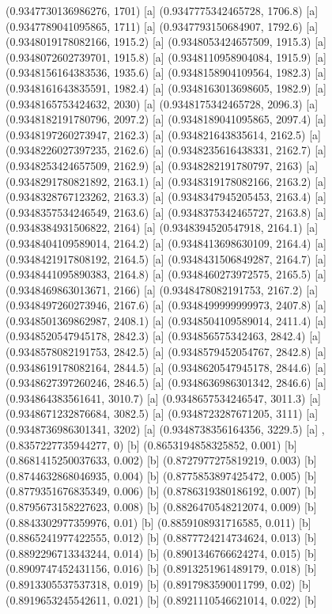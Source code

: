 {{{(0.9347730136986276, 1701) [a] 
(0.9347775342465728, 1706.8) [a] 
(0.9347789041095865, 1711) [a] 
(0.9347793150684907, 1792.6) [a] 
(0.9348019178082166, 1915.2) [a] 
(0.9348053424657509, 1915.3) [a] 
(0.9348072602739701, 1915.8) [a] 
(0.9348110958904084, 1915.9) [a] 
(0.9348156164383536, 1935.6) [a] 
(0.9348158904109564, 1982.3) [a] 
(0.9348161643835591, 1982.4) [a] 
(0.9348163013698605, 1982.9) [a] 
(0.9348165753424632, 2030) [a] 
(0.9348175342465728, 2096.3) [a] 
(0.9348182191780796, 2097.2) [a] 
(0.9348189041095865, 2097.4) [a] 
(0.9348197260273947, 2162.3) [a] 
(0.934821643835614, 2162.5) [a] 
(0.9348226027397235, 2162.6) [a] 
(0.9348235616438331, 2162.7) [a] 
(0.9348253424657509, 2162.9) [a] 
(0.9348282191780797, 2163) [a] 
(0.9348291780821892, 2163.1) [a] 
(0.9348319178082166, 2163.2) [a] 
(0.9348328767123262, 2163.3) [a] 
(0.9348347945205453, 2163.4) [a] 
(0.9348357534246549, 2163.6) [a] 
(0.9348375342465727, 2163.8) [a] 
(0.9348384931506822, 2164) [a] 
(0.9348394520547918, 2164.1) [a] 
(0.9348404109589014, 2164.2) [a] 
(0.9348413698630109, 2164.4) [a] 
(0.9348421917808192, 2164.5) [a] 
(0.9348431506849287, 2164.7) [a] 
(0.9348441095890383, 2164.8) [a] 
(0.9348460273972575, 2165.5) [a] 
(0.9348469863013671, 2166) [a] 
(0.9348478082191753, 2167.2) [a] 
(0.9348497260273946, 2167.6) [a] 
(0.9348499999999973, 2407.8) [a] 
(0.9348501369862987, 2408.1) [a] 
(0.9348504109589014, 2411.4) [a] 
(0.9348520547945178, 2842.3) [a] 
(0.934856575342463, 2842.4) [a] 
(0.9348578082191753, 2842.5) [a] 
(0.9348579452054767, 2842.8) [a] 
(0.9348619178082164, 2844.5) [a] 
(0.9348620547945178, 2844.6) [a] 
(0.9348627397260246, 2846.5) [a] 
(0.9348636986301342, 2846.6) [a] 
(0.934864383561641, 3010.7) [a] 
(0.9348657534246547, 3011.3) [a] 
(0.9348671232876684, 3082.5) [a] 
(0.9348723287671205, 3111) [a] 
(0.9348736986301341, 3202) [a] 
(0.9348738356164356, 3229.5) [a] 
},{(0.8357227735944277, 0) [b] 
(0.8653194858325852, 0.001) [b] 
(0.8681415250037633, 0.002) [b] 
(0.8727977275819219, 0.003) [b] 
(0.8744632868046935, 0.004) [b] 
(0.8775853897425472, 0.005) [b] 
(0.8779351676835349, 0.006) [b] 
(0.8786319380186192, 0.007) [b] 
(0.8795673158227623, 0.008) [b] 
(0.8826470548212074, 0.009) [b] 
(0.8843302977359976, 0.01) [b] 
(0.8859108931716585, 0.011) [b] 
(0.8865241977422555, 0.012) [b] 
(0.8877724214734624, 0.013) [b] 
(0.8892296713343244, 0.014) [b] 
(0.8901346766624274, 0.015) [b] 
(0.8909747452431156, 0.016) [b] 
(0.8913251961489179, 0.018) [b] 
(0.8913305537537318, 0.019) [b] 
(0.8917983590011799, 0.02) [b] 
(0.8919653245542611, 0.021) [b] 
(0.8921110546621014, 0.022) [b] 
}}}
